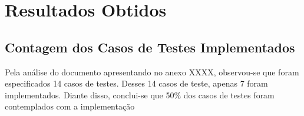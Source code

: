 \chapter[Resultados Obtidos]{Resultados Obtidos}

\section{Contagem dos Casos de Testes Implementados}
Pela análise do documento apresentando no anexo XXXX, observou-se que  foram especificados 14 casos de testes. Desses 14 casos de teste, apenas 7 foram implementados. Diante disso, conclui-se que 50\% dos casos de testes foram contemplados com a implementação

\label{sec:contagem-casos}
